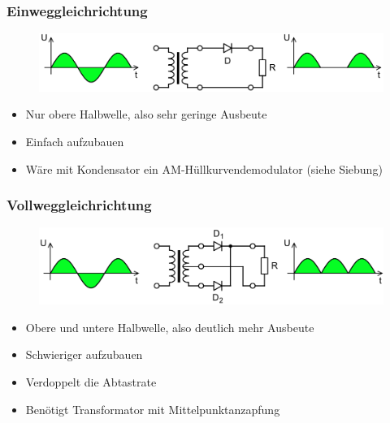 \begin{frame}
  \frametitle{Einweggleichrichtung}
  \begin{center}
    \begin{figure}
      \includegraphics[width=1\textwidth,height=.6\textheight,keepaspectratio]{a05/Halfwave_rectifier.png}
    \end{figure}
    \begin{itemize}
      \item Nur obere Halbwelle, also sehr geringe Ausbeute
      \item Einfach aufzubauen
      \item Wäre mit Kondensator ein AM-Hüllkurvendemodulator (siehe Siebung)
    \end{itemize}
  \end{center}
\end{frame}

\begin{frame}
  \frametitle{Vollweggleichrichtung}
  \begin{center}
    \begin{figure}
      \includegraphics[width=1\textwidth,height=.6\textheight,keepaspectratio]{a05/Fullwave_rectifier.png}
    \end{figure}
    \begin{itemize}
      \item Obere und untere Halbwelle, also deutlich mehr Ausbeute
      \item Schwieriger aufzubauen
      \item Verdoppelt die Abtastrate
      \item Benötigt Transformator mit Mittelpunktanzapfung
    \end{itemize}
  \end{center}
\end{frame}

